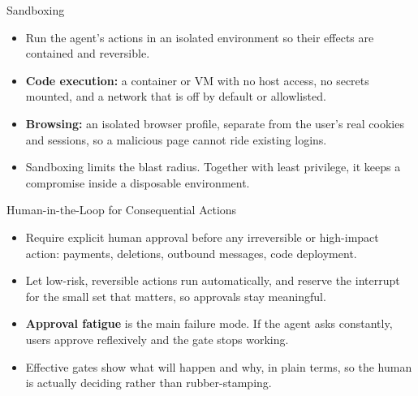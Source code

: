 \begin{frame}{Sandboxing}
  \begin{itemize}\itemsep0.5em
    \item[\textcolor{KAred}{$\blacktriangleright$}] Run the agent's actions in an isolated environment so their effects are contained and reversible.
    \item[\textcolor{KAred}{$\blacktriangleright$}] \textbf{Code execution:} a container or VM with no host access, no secrets mounted, and a network that is off by default or allowlisted.
    \item[\textcolor{KAred}{$\blacktriangleright$}] \textbf{Browsing:} an isolated browser profile, separate from the user's real cookies and sessions, so a malicious page cannot ride existing logins.
    \item[\textcolor{KAred}{$\blacktriangleright$}] Sandboxing limits the blast radius. Together with least privilege, it keeps a compromise inside a disposable environment.
  \end{itemize}
\end{frame}

\begin{frame}{Human-in-the-Loop for Consequential Actions}
  \begin{itemize}\itemsep0.5em
    \item[\textcolor{KAred}{$\blacktriangleright$}] Require explicit human approval before any irreversible or high-impact action: payments, deletions, outbound messages, code deployment.
    \item[\textcolor{KAred}{$\blacktriangleright$}] Let low-risk, reversible actions run automatically, and reserve the interrupt for the small set that matters, so approvals stay meaningful.
    \item[\textcolor{KAred}{$\blacktriangleright$}] \textbf{Approval fatigue} is the main failure mode. If the agent asks constantly, users approve reflexively and the gate stops working.
    \item[\textcolor{KAred}{$\blacktriangleright$}] Effective gates show what will happen and why, in plain terms, so the human is actually deciding rather than rubber-stamping.
  \end{itemize}
\end{frame}

